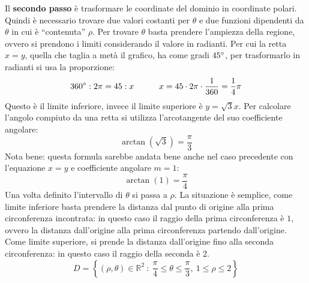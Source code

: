 \documentclass[a4paper]{article}
\newcommand{\dquotes}[1]{``#1''}
\begin{document}
	\noindent
	Il \textbf{secondo passo} è trasformare le coordinate del dominio in coordinate polari. Quindi è necessario trovare due valori costanti per $\theta$ e due funzioni dipendenti da $\theta$ in cui è \dquotes{contenuta} $\rho$. Per trovare $\theta$ basta prendere l'ampiezza della regione, ovvero si prendono i limiti considerando il valore in radianti. Per cui la retta $x = y$, quella che taglia a metà il grafico, ha come gradi $45\degree$, per trasformarlo in radianti si usa la proporzione:
	\begin{equation*}
		360\degree : 2\pi = 45 : x \hspace{3em} x = 45 \cdot 2\pi \cdot \dfrac{1}{360} = \dfrac{1}{4}\pi
	\end{equation*}
	Questo è il limite inferiore, invece il limite superiore è $y = \sqrt{3}x$. Per calcolare l'angolo compiuto da una retta si utilizza l'arcotangente del suo coefficiente angolare:
	\begin{equation*}
		\arctan\left(\sqrt{3}\right) = \dfrac{\pi}{3}
	\end{equation*}
	Nota bene: questa formula sarebbe andata bene anche nel caso precedente con l'equazione $x = y$ e coefficiente angolare $m = 1$:
	\begin{equation*}
		\arctan\left(1\right) = \dfrac{\pi}{4}
	\end{equation*}
	Una volta definito l'intervallo di $\theta$ si passa a $\rho$. La situazione è semplice, come limite inferiore basta prendere la distanza dal punto di origine alla prima circonferenza incontrata: in questo caso il raggio della prima circonferenza è $1$, ovvero la distanza dall'origine alla prima circonferenza partendo dall'origine. Come limite superiore, si prende la distanza dall'origine fino alla seconda circonferenza: in questo caso il raggio della seconda è $2$.
	\begin{equation*}
		D = \left\{\left(\rho,\theta\right) \in \mathbb{R}^{2} \: : \: \dfrac{\pi}{4} \le \theta \le \dfrac{\pi}{3}, \: 1 \le \rho \le 2\right\}
	\end{equation*}\newpage
\end{document}
